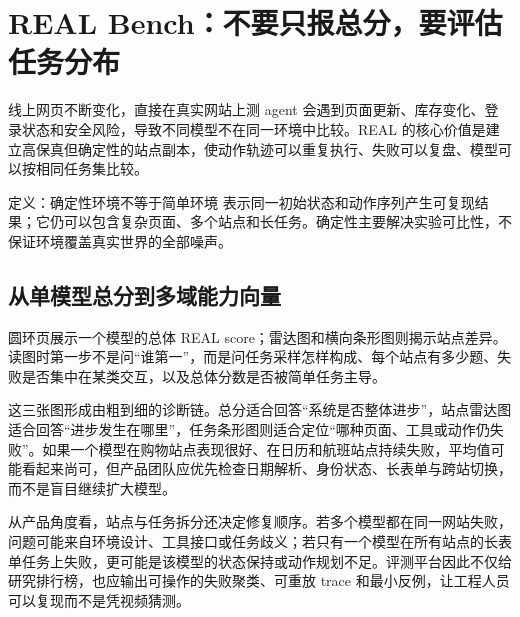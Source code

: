 \section{REAL Bench：不要只报总分，要评估任务分布}

线上网页不断变化，直接在真实网站上测 agent 会遇到页面更新、库存变化、登录状态和安全风险，导致不同模型不在同一环境中比较。REAL 的核心价值是建立高保真但确定性的站点副本，使动作轨迹可以重复执行、失败可以复盘、模型可以按相同任务集比较。


\begin{importantbox}{定义：确定性环境不等于简单环境}
 表示同一初始状态和动作序列产生可复现结果；它仍可以包含复杂页面、多个站点和长任务。确定性主要解决实验可比性，不保证环境覆盖真实世界的全部噪声。
\end{importantbox}

\subsection{从单模型总分到多域能力向量}

圆环页展示一个模型的总体 REAL score；雷达图和横向条形图则揭示站点差异。读图时第一步不是问“谁第一”，而是问任务采样怎样构成、每个站点有多少题、失败是否集中在某类交互，以及总体分数是否被简单任务主导。

这三张图形成由粗到细的诊断链。总分适合回答“系统是否整体进步”，站点雷达图适合回答“进步发生在哪里”，任务条形图则适合定位“哪种页面、工具或动作仍失败”。如果一个模型在购物站点表现很好、在日历和航班站点持续失败，平均值可能看起来尚可，但产品团队应优先检查日期解析、身份状态、长表单与跨站切换，而不是盲目继续扩大模型。




从产品角度看，站点与任务拆分还决定修复顺序。若多个模型都在同一网站失败，问题可能来自环境设计、工具接口或任务歧义；若只有一个模型在所有站点的长表单任务上失败，更可能是该模型的状态保持或动作规划不足。评测平台因此不仅给研究排行榜，也应输出可操作的失败聚类、可重放 trace 和最小反例，让工程人员可以复现而不是凭视频猜测。

